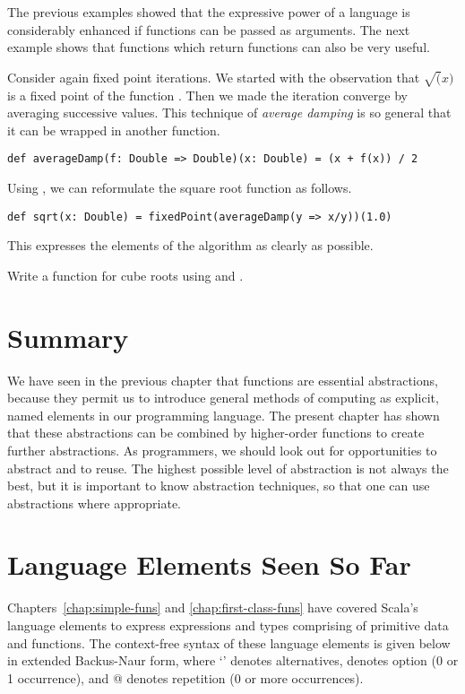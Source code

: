 The previous examples showed that the expressive power of a language
is considerably enhanced if functions can be passed as arguments.  The
next example shows that functions which return functions can also be
very useful.

Consider again fixed point iterations. We started with the observation
that $\sqrt(x)$ is a fixed point of the function .
Then we made the iteration converge by averaging successive values.
This technique of {\em average damping} is so general that it
can be wrapped in another function.
\begin{lstlisting}
def averageDamp(f: Double => Double)(x: Double) = (x + f(x)) / 2
\end{lstlisting}
Using , we can reformulate the square root function
as follows.
\begin{lstlisting}
def sqrt(x: Double) = fixedPoint(averageDamp(y => x/y))(1.0)
\end{lstlisting}
This expresses the elements of the algorithm as clearly as possible.

\begin{exercise} Write a function for cube roots using  and 
.
\end{exercise}

\section{Summary}

We have seen in the previous chapter that functions are essential
abstractions, because they permit us to introduce general methods of
computing as explicit, named elements in our programming language.
The present chapter has shown that these abstractions can be combined
by higher-order functions to create further abstractions.  As
programmers, we should look out for opportunities to abstract and to
reuse. The highest possible level of abstraction is not always the
best, but it is important to know abstraction techniques, so that one
can use abstractions where appropriate.

\section{Language Elements Seen So Far}

Chapters~\ref{chap:simple-funs} and \ref{chap:first-class-funs} have
covered Scala's language elements to express expressions and types
comprising of primitive data and functions.  The context-free syntax
of these language elements is given below in extended Backus-Naur
form, where `\code{|}' denotes alternatives, \code{[...]} denotes
option (0 or 1 occurrence), and @ denotes repetition
(0 or more occurrences).

